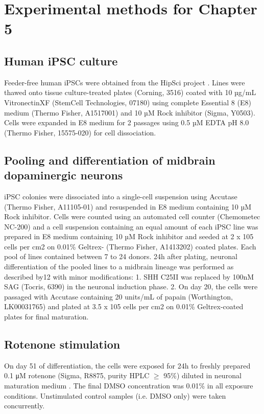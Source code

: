 \section{Experimental methods for Chapter 5}

\subsection{Human iPSC culture}
Feeder-free human iPSCs were obtained from the HipSci project \cite{kilpinen2017common}. 
Lines were thawed onto tissue culture-treated plates (Corning, 3516) coated with 10 µg/mL VitronectinXF (StemCell Technologies, 07180) using complete Essential 8 (E8) medium (Thermo Fisher, A1517001) and 10 µM Rock inhibitor (Sigma, Y0503). 
Cells were expanded in E8 medium for 2 passages using 0.5 µM EDTA pH 8.0 (Thermo Fisher, 15575-020) for cell dissociation. 

\subsection{Pooling and differentiation of midbrain dopaminergic neurons}
iPSC colonies were dissociated into a single-cell suspension using Accutase (Thermo Fisher, A11105-01) and resuspended in E8 medium containing 10 µM Rock inhibitor. 
Cells were counted using an automated cell counter (Chemometec NC-200) and a cell suspension containing an equal amount of each iPSC line was prepared in E8 medium containing 10 µM Rock inhibitor and seeded at 2 x 105 cells per cm2 on 0.01\% Geltrex- (Thermo Fisher, A1413202) coated plates. 
Each pool of lines contained between 7 to 24 donors. 
24h after plating, neuronal differentiation of the pooled lines to a midbrain lineage was performed as described by12 with minor modifications: 1. SHH C25II was replaced by 100nM SAG (Tocris, 6390) in the neuronal induction phase. 
2. On day 20, the cells were passaged with Accutase containing 20 units/mL of papain (Worthington, LK00031765) and plated at 3.5 x 105 cells per cm2 on 0.01\% Geltrex-coated plates for final maturation.

\subsection{Rotenone stimulation}
On day 51 of differentiation, the cells were exposed for 24h to freshly prepared 0.1 μM rotenone (Sigma, R8875, purity HPLC $\geq$ 95\%) diluted in neuronal maturation medium \cite{kriks2011dopamine}. 
The final DMSO concentration was 0.01\% in all exposure conditions. 
Unstimulated control samples (i.e. DMSO only) were taken concurrently.

